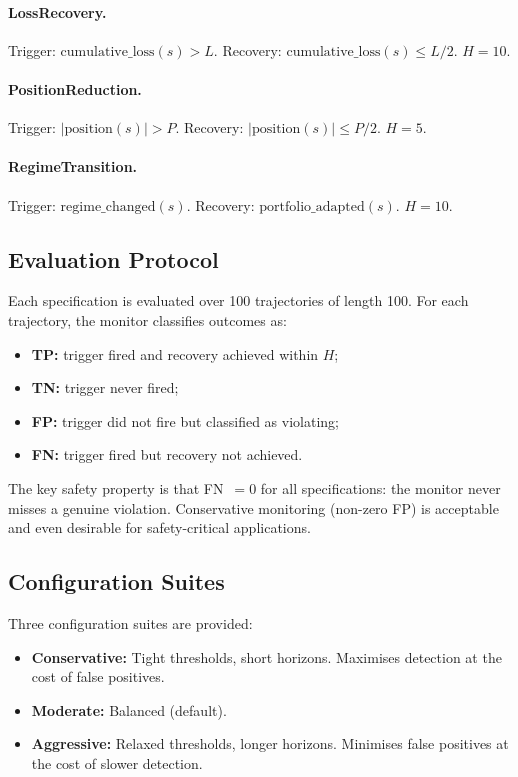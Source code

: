 \documentclass[11pt]{article}
\begin{document}
\paragraph{LossRecovery.}
Trigger: $\mathrm{cumulative\_loss}(s) > L$.  Recovery:
$\mathrm{cumulative\_loss}(s) \leq L/2$.  $H = 10$.

\paragraph{PositionReduction.}
Trigger: $|\mathrm{position}(s)| > P$.  Recovery:
$|\mathrm{position}(s)| \leq P/2$.  $H = 5$.

\paragraph{RegimeTransition.}
Trigger: $\mathrm{regime\_changed}(s)$.  Recovery:
$\mathrm{portfolio\_adapted}(s)$.  $H = 10$.

\subsection{Evaluation Protocol}

Each specification is evaluated over 100 trajectories of length 100.
For each trajectory, the monitor classifies outcomes as:
\begin{itemize}[nosep]
  \item \textbf{TP:} trigger fired and recovery achieved within $H$;
  \item \textbf{TN:} trigger never fired;
  \item \textbf{FP:} trigger did not fire but classified as violating;
  \item \textbf{FN:} trigger fired but recovery not achieved.
\end{itemize}

The key safety property is that FN~$= 0$ for all specifications: the
monitor never misses a genuine violation.  Conservative monitoring
(non-zero FP) is acceptable and even desirable for safety-critical
applications.

\subsection{Configuration Suites}

Three configuration suites are provided:
\begin{itemize}[nosep]
  \item \textbf{Conservative:} Tight thresholds, short horizons.
        Maximises detection at the cost of false positives.
  \item \textbf{Moderate:} Balanced (default).
  \item \textbf{Aggressive:} Relaxed thresholds, longer horizons.
        Minimises false positives at the cost of slower detection.
\end{itemize}
\end{document}
